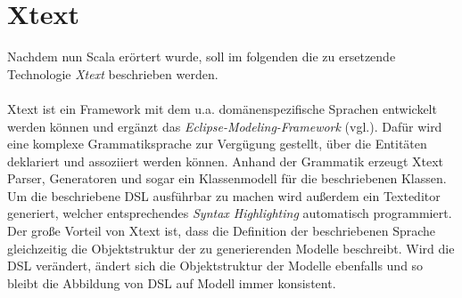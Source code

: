\section{Xtext}\label{xtext}
Nachdem nun Scala erörtert wurde, soll im folgenden die zu ersetzende Technologie \textit{Xtext} beschrieben werden.
\\\\Xtext ist ein Framework mit dem u.a. domänenspezifische Sprachen entwickelt werden können und ergänzt das \textit{Eclipse-Modeling-Framework} (vgl.). Dafür wird eine komplexe Grammatiksprache zur Vergügung gestellt, über die Entitäten deklariert und assoziiert werden können. Anhand der Grammatik erzeugt Xtext Parser, Generatoren und sogar ein Klassenmodell für die beschriebenen Klassen. Um die beschriebene DSL ausführbar zu machen wird außerdem ein Texteditor generiert, welcher entsprechendes \textit{Syntax Highlighting} automatisch programmiert. Der große Vorteil von Xtext ist, dass die Definition der beschriebenen Sprache gleichzeitig die Objektstruktur der zu generierenden Modelle beschreibt. Wird die DSL verändert, ändert sich die Objektstruktur der Modelle ebenfalls und so bleibt die Abbildung von DSL auf Modell immer konsistent. 
